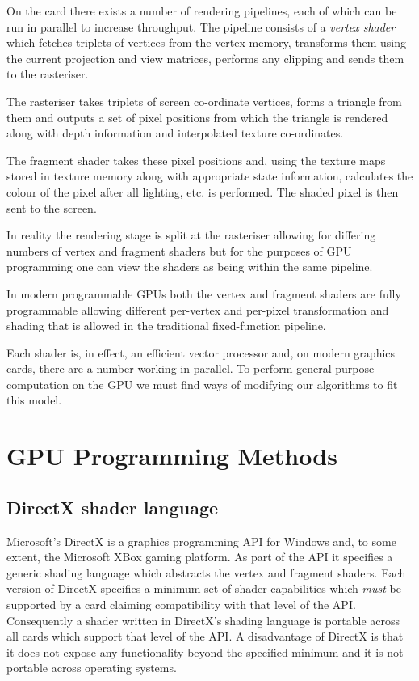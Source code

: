 On the card there exists a number of rendering pipelines, each of which
can be run in parallel to increase throughput. The pipeline consists
of a \emph{vertex shader} which fetches triplets of vertices from
the vertex memory, transforms them using the current projection and 
view matrices, performs any clipping and sends them to the rasteriser.

The rasteriser takes triplets of screen co-ordinate vertices, forms
a triangle from them and outputs a set of pixel positions from which
the triangle is rendered along with depth information and interpolated texture
co-ordinates. 

The fragment shader takes these pixel positions and, using the texture maps
stored in texture memory along with appropriate state information, calculates
the colour of the pixel after all lighting, etc. is performed. The shaded pixel
is then sent to the screen.

In reality the rendering stage is split at the rasteriser allowing for differing
numbers of vertex and fragment shaders but for the purposes of GPU programming
one can view the shaders as being within the same pipeline.

In modern programmable GPUs both the vertex and fragment shaders are fully 
programmable allowing different per-vertex and per-pixel transformation
and shading that is allowed in the traditional fixed-function pipeline.

Each shader is, in effect, an efficient vector processor and, on modern 
graphics cards, there are a number working in parallel. To perform
general purpose computation on the GPU we must find ways of modifying our
algorithms to fit this model.

\section{GPU Programming Methods}

\subsection{DirectX shader language}

Microsoft's DirectX\cite{GPU:DirectX} is a graphics programming API for
Windows and, to some extent, the Microsoft XBox gaming platform. As part of
the API it specifies a generic shading language\cite{GPU:DirectXShadingLanguage}
which abstracts the vertex and fragment shaders. Each version of DirectX
specifies a minimum set of shader capabilities which \emph{must} be supported by a 
card claiming compatibility with that level of the API. Consequently a shader written in
DirectX's shading language is portable across all cards which support that level
of the API. A disadvantage of DirectX is that it does not expose any functionality
beyond the specified minimum and it is not portable across operating systems.

